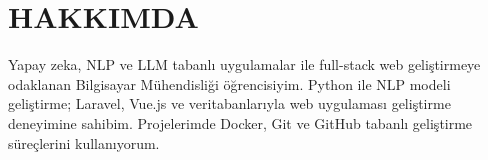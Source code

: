
\section{HAKKIMDA}

Yapay zeka, NLP ve LLM tabanlı uygulamalar ile full-stack web geliştirmeye odaklanan Bilgisayar Mühendisliği öğrencisiyim. Python ile NLP modeli geliştirme; Laravel, Vue.js ve veritabanlarıyla web uygulaması geliştirme deneyimine sahibim. Projelerimde Docker, Git ve GitHub tabanlı geliştirme süreçlerini kullanıyorum.
